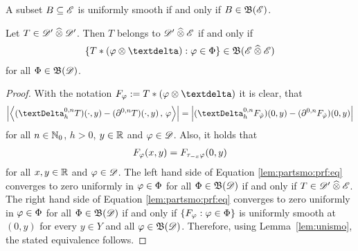 \begin{lemma}
    \label{lem:unismo}
    A subset $ B \subseteq \mathscr{  E  } $ is uniformly smooth
    if and only if $ B \in \operatorname{\mathfrak{ B }}(\mathscr{  E  }) $.
\end{lemma}

\begin{lemma}
    \label{lem:partsmo}
    Let $ T \in \mathscr{  D  }' \mathbin{\widehat{\otimes}} \mathscr{  D  }' $.
    Then $ T $ belongs to $ \mathscr{  D  }' \mathbin{\widehat{\otimes}} \mathscr{  E  } $ if and only if
    \begin{align}
        \brmSet{ T * ( \ph \tepro \sfdeo ) }{ \ph \in \Ph }
        \in
        \ssBnd( \fsSmo \ctepro \fsSmo )
        \label{lem:partsmo:eq}
    \end{align}
    for all $ \Phi \in \operatorname{\mathfrak{ B }}(\mathscr{  D  }) $.
\end{lemma}

\begin{proof}
    With the notation $ F_\ph := T * ( \ph \tepro \sfdeo ) $
    it is clear, that
    \begin{align}
        \Abs{ \Ska{ ( \tDe^{0,n}_h T )( \cdot, y )  -
        ( \partial^{0,n}T )( \cdot, y ) }{ \ph } }
        =
        \Abs{ ( \tDe^{0,n}_h F_{\refl{\ph}} )(0,y)  -
        ( \partial^{0,n} F_{\refl{\ph}} )(0,y) }
        \label{lem:partsmo:prf:eq}
    \end{align}
    for all $ n \in \mathbb{ N }_0 $, $ h > 0 $, $ y \in \mathbb{ R } $ and $ \varphi \in \mathscr{  D  } $.
    Also, it holds that
    \begin{align}
        F_\varphi(x,y) = F_{\tau_{-x}\varphi}(0,y)
    \end{align}
    for all $ x,y \in \mathbb{ R } $ and $ \varphi \in \mathscr{  D  } $.
    The left hand side of Equation \eqref{lem:partsmo:prf:eq}
    converges to zero uniformly in $ \varphi \in \Phi $ for all $ \Phi \in \operatorname{\mathfrak{ B }}(\mathscr{  D  }) $
    if and only if $ T \in \mathscr{  D  }' \mathbin{\widehat{\otimes}} \mathscr{  E  } $.
    The right hand side of Equation \eqref{lem:partsmo:prf:eq}
    converges to zero uniformly in $ \varphi \in \Phi $ for all $ \Phi \in \operatorname{\mathfrak{ B }}(\mathscr{  D  }) $
    if and only if $ \{   F_\varphi  :  \varphi \in \Phi   \} $
    is uniformly smooth at $ (0,y) $ for every $ y \in Y $
    and all $ \varphi \in \operatorname{\mathfrak{ B }}(\mathscr{  D  }) $.
    Therefore, using Lemma~\ref{lem:unismo}, the stated equivalence follows.
\end{proof}

